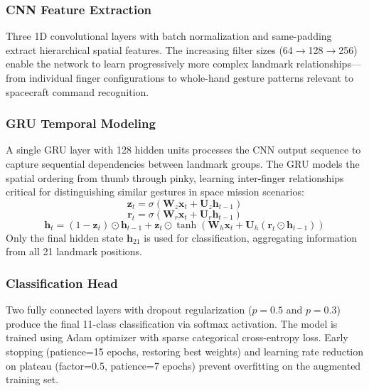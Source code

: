 \documentclass[conference]{IEEEtran}
\begin{document}
\subsubsection{CNN Feature Extraction}
Three 1D convolutional layers with batch normalization and same-padding extract hierarchical spatial features. The increasing filter sizes (64$\rightarrow$128$\rightarrow$256) enable the network to learn progressively more complex landmark relationships—from individual finger configurations to whole-hand gesture patterns relevant to spacecraft command recognition.

\subsubsection{GRU Temporal Modeling}
A single GRU layer with 128 hidden units \cite{ref_gru} processes the CNN output sequence to capture sequential dependencies between landmark groups. The GRU models the spatial ordering from thumb through pinky, learning inter-finger relationships critical for distinguishing similar gestures in space mission scenarios:
\begin{equation}
    \mathbf{z}_t = \sigma(\mathbf{W}_z \mathbf{x}_t + \mathbf{U}_z \mathbf{h}_{t-1})
\end{equation}
\begin{equation}
    \mathbf{r}_t = \sigma(\mathbf{W}_r \mathbf{x}_t + \mathbf{U}_r \mathbf{h}_{t-1})
\end{equation}
\begin{equation}
    \mathbf{h}_t = (1 - \mathbf{z}_t) \odot \mathbf{h}_{t-1} + \mathbf{z}_t \odot \tanh(\mathbf{W}_h \mathbf{x}_t + \mathbf{U}_h(\mathbf{r}_t \odot \mathbf{h}_{t-1}))
\end{equation}
Only the final hidden state $\mathbf{h}_{21}$ is used for classification, aggregating information from all 21 landmark positions.

\subsubsection{Classification Head}
Two fully connected layers with dropout regularization ($p=0.5$ and $p=0.3$) produce the final 11-class classification via softmax activation. The model is trained using Adam optimizer \cite{ref_tensorflow} with sparse categorical cross-entropy loss. Early stopping (patience=15 epochs, restoring best weights) and learning rate reduction on plateau (factor=0.5, patience=7 epochs) prevent overfitting on the augmented training set.
\end{document}
